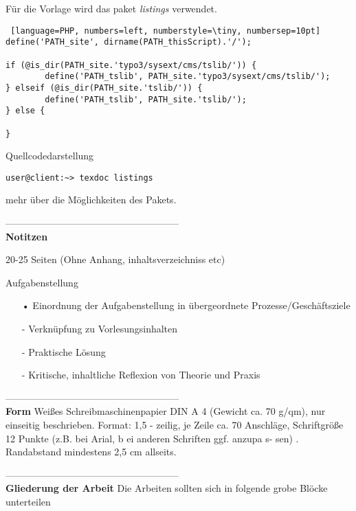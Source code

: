 


Für die Vorlage wird das paket \textit{listings} verwendet. \\

\begin{lstlisting} [language=PHP, numbers=left, numberstyle=\tiny, numbersep=10pt]
define('PATH_site', dirname(PATH_thisScript).'/');

if (@is_dir(PATH_site.'typo3/sysext/cms/tslib/')) {
        define('PATH_tslib', PATH_site.'typo3/sysext/cms/tslib/');
} elseif (@is_dir(PATH_site.'tslib/')) {
        define('PATH_tslib', PATH_site.'tslib/');
} else {
      
}
\end{lstlisting}

Quellcodedarstellung 

\begin{verbatim}
user@client:~> texdoc listings
\end{verbatim}

mehr über die Möglichkeiten des Pakets.

------------------------------------------------------\\
\textbf{Notitzen}

20-25 Seiten (Ohne Anhang, inhaltsverzeichniss etc)

Aufgabenstellung

\begin{itemize}
\item[•] Einordnung der Aufgabenstellung in übergeordnete Prozesse/Geschäftsziele
\item[-] Verknüpfung zu Vorlesungsinhalten
\item[-] Praktische Lösung
\item[-] Kritische, inhaltliche Reflexion von Theorie und Praxis
\end{itemize}


------------------------------------------------------\\
\textbf{Form}
Weißes 
Schreibmaschinenpapier  DIN  A  4  (Gewicht  ca.  70  g/qm),  nur  einseitig  beschrieben.  Format:  1,5 
-
zeilig, je Zeile ca. 70 Anschläge, Schriftgröße 12 Punkte
(z.B. bei Arial, b
ei
anderen Schriften ggf. anzupa
s-
sen)
. Randabstand mindestens 2,5 cm allseits.


------------------------------------------------------\\
\textbf{Gliederung der Arbeit}
Die Arbeiten sollten sich in folgende grobe Blöcke unterteilen


